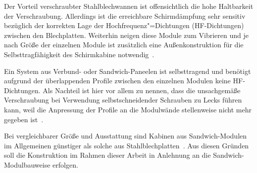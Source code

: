 Der Vorteil verschraubter Stahlblechwannen ist offensichtlich die hohe Haltbarkeit der Verschraubung. Allerdings ist die erreichbare Schirmdämpfung sehr sensitiv bezüglich der korrekten Lage der Hochfrequenz"=Dichtungen (HF-Dichtungen) zwischen den Blechplatten. Weiterhin neigen diese Module zum Vibrieren und je nach Größe der einzelnen Module ist zusätzlich eine Außenkonstruktion für die Selbsttragfähigkeit des Schirmkabine notwendig~\cite{EM_Schirmung}.
\par
\vspace{\linespace}
Ein System aus Verbund- oder Sandwich-Paneelen ist selbsttragend und benötigt aufgrund der überlappenden Profile zwischen den einzelnen Modulen keine HF-Dichtungen. Als Nachteil ist hier vor allem zu nennen, dass die unsachgemäße Verschraubung bei Verwendung selbstschneidender Schrauben zu Lecks führen kann, weil die Anpressung der Profile an die Modulwände stellenweise nicht mehr gegeben ist~\cite{EM_Schirmung}. 
\par
\vspace{\linespace}
Bei vergleichbarer Größe und Ausstattung sind Kabinen aus Sandwich-Modulen im Allgemeinen günstiger als solche aus Stahlblechplatten~\cite{EMC-Technik_Sandwichmodul, EMC-Technik_Stahlblechplatten}. Aus diesen Gründen soll die Konstruktion im Rahmen dieser Arbeit in Anlehnung an die Sandwich-Modulbauweise erfolgen. 





